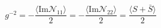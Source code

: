 \begin{equation}
g^{-2}=-\frac{ \langle\textrm{Im} \mathcal{N}_{11} \rangle}{2}=
-\frac{\langle \textrm{Im}
\mathcal{N}_{22} \rangle}{2} = \frac{\langle S+\bar{S} \rangle}{2}
\end{equation}

